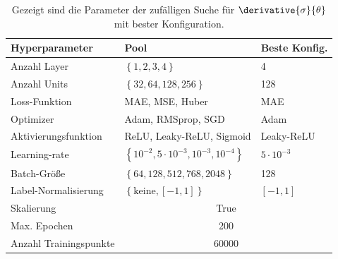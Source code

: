 \begin{table}
	\centering
	\caption{Gezeigt sind die Parameter der zufälligen Suche für $\derivative{\sigma}{\theta}$ mit bester Konfiguration.}
	\begin{tabular}{lll}
		Hyperparameter & Pool & Beste Konfig. \\
		\hline\hline
		Anzahl Layer & $\left\lbrace 1, 2, 3, 4 \right\rbrace$ & 4 \\
		Anzahl Units & $\left\lbrace 32, 64, 128, 256\right\rbrace$ & 128 \\
		Loss-Funktion & MAE, MSE, Huber & MAE \\
		Optimizer & Adam, RMSprop, SGD  & Adam\\
		Aktivierungsfunktion & ReLU, Leaky-ReLU, Sigmoid & Leaky-ReLU \\
		Learning-rate & $\left\lbrace 10^{-2}, 5 \cdot 10^{-3}, 10^{-3}, 10^{-4} \right\rbrace $ & $5 \cdot 10^{-3}$\\
		Batch-Größe & $\left\lbrace 64, 128, 512, 768, 2048 \right\rbrace $ & 128\\
		Label-Normalisierung & $\left\lbrace \text{keine}, [-1,1]\right\rbrace $ & $[-1,1]$\\
		\hline
		Skalierung & \multicolumn{2}{c}{True} \\
		Max. Epochen & \multicolumn{2}{c}{200}\\
		Anzahl Trainingspunkte & \multicolumn{2}{c}{60000} \\
		\hline
	\end{tabular}
	\label{hyperparameter-theta}
\end{table}
